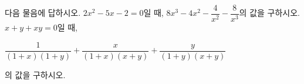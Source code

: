 다음 물음에 답하시오.
 $2x^2-5x-2=0$일 때, $8x^3-4x^2-\dfrac{4}{x^2}-\dfrac{8}{x^3}$의 값을 구하시오.
 $x+y+xy=0$일 때,\par\smallskip\centerline{$\dfrac{1}{(1+x)(1+y)}+\dfrac{x}{(1+x)(x+y)}+\dfrac{y}{(1+y)(x+y)}$}\par\smallskip\noindent\hspace*{1.6em}의 값을 구하시오. 
